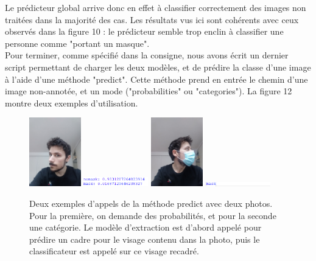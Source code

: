 \documentclass{article}
\begin{document}
Le prédicteur global arrive donc en effet à classifier correctement des images non traitées dans la majorité des cas. Les résultats vus ici sont cohérents avec ceux observés dans la figure 10 : le prédicteur semble trop enclin à classifier une personne comme "portant un masque".\\
Pour terminer, comme spécifié dans la consigne, nous avons écrit un dernier script permettant de charger les deux modèles, et de prédire la classe d'une image à l'aide d'une méthode "predict". Cette méthode prend en entrée le chemin d'une image non-annotée, et un mode ("probabilities" ou "categories"). La figure 12 montre deux exemples d'utilisation.\\
\begin{figure}[h]
\centering
\includegraphics[width=0.2\textwidth]{20220115_150828.jpg}
\includegraphics[width=0.25\textwidth]{pred_probabilities.png}
\includegraphics[width=0.2\textwidth]{20220115_150910.jpg}
\includegraphics[width=0.25\textwidth]{pred_categories.png}
\caption{\label{fig:Input}Deux exemples d'appels de la méthode predict avec deux photos. Pour la première, on demande des probabilités, et pour la seconde une catégorie. Le modèle d'extraction est d'abord appelé pour prédire un cadre pour le visage contenu dans la photo, puis le classificateur est appelé sur ce visage recadré.\\}
\end{figure}
\end{document}
